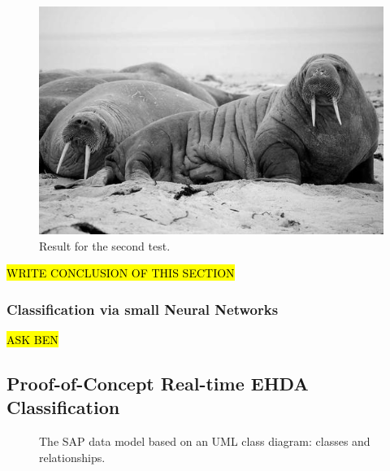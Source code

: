 \documentclass[oneside,12pt]{article}
\begin{document}
\begin{figure}[h!]
    \centering
    \includegraphics[width=.8\textwidth,trim=1 1 1 1,clip]{figures/lorem-picsum.jpg}
    \caption{Result for the second test.}
    \label{fig:snr-subsample}
\end{figure}

\hl{WRITE CONCLUSION OF THIS SECTION}

\subsubsection{Classification via small Neural Networks}

\hl{ASK BEN}

\subsection{Proof-of-Concept Real-time EHDA Classification}

\begin{landscape}
    \begin{figure}[tb] 
        \centering
        \caption{The SAP data model based on an UML class diagram: classes and relationships.}
        \label{fig:Fig5}
    \end{figure}
\end{landscape}
\end{document}
